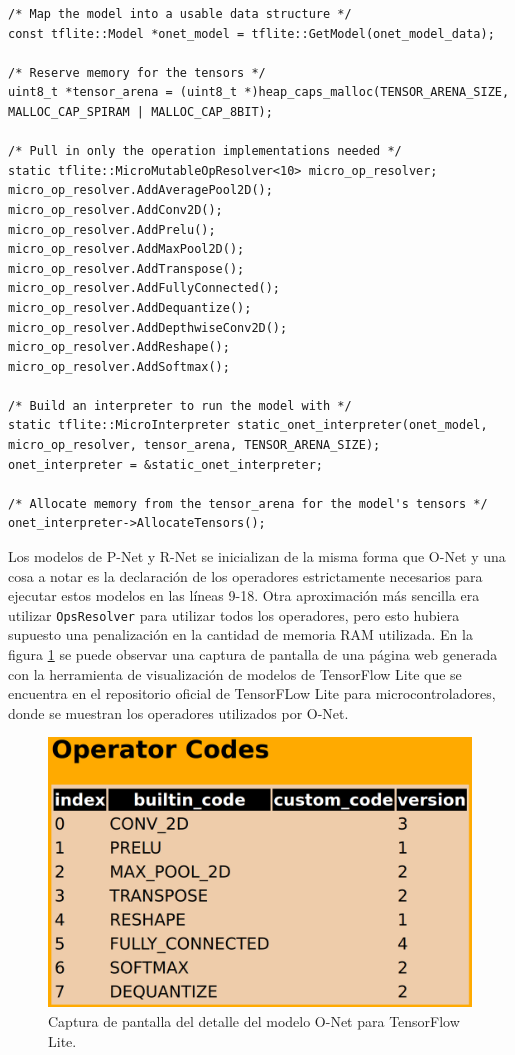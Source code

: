 \begin{lstlisting}[label=cod:tflm_init,caption=Código para inicializar O-Net con TFLite micro.]
/* Map the model into a usable data structure */
const tflite::Model *onet_model = tflite::GetModel(onet_model_data);

/* Reserve memory for the tensors */
uint8_t *tensor_arena = (uint8_t *)heap_caps_malloc(TENSOR_ARENA_SIZE, MALLOC_CAP_SPIRAM | MALLOC_CAP_8BIT);

/* Pull in only the operation implementations needed */
static tflite::MicroMutableOpResolver<10> micro_op_resolver;
micro_op_resolver.AddAveragePool2D();
micro_op_resolver.AddConv2D();
micro_op_resolver.AddPrelu();
micro_op_resolver.AddMaxPool2D();
micro_op_resolver.AddTranspose();
micro_op_resolver.AddFullyConnected();
micro_op_resolver.AddDequantize();
micro_op_resolver.AddDepthwiseConv2D();
micro_op_resolver.AddReshape();
micro_op_resolver.AddSoftmax();

/* Build an interpreter to run the model with */
static tflite::MicroInterpreter static_onet_interpreter(onet_model, micro_op_resolver, tensor_arena, TENSOR_ARENA_SIZE);
onet_interpreter = &static_onet_interpreter;

/* Allocate memory from the tensor_arena for the model's tensors */
onet_interpreter->AllocateTensors();
\end{lstlisting}

Los modelos de P-Net y R-Net se inicializan de la misma forma que O-Net y una cosa a notar es la declaración de los operadores estrictamente necesarios para ejecutar estos modelos en las líneas 9-18. Otra aproximación más sencilla era utilizar \texttt{OpsResolver} para utilizar todos los operadores, pero esto hubiera supuesto una penalización en la cantidad de memoria RAM utilizada. En la figura \ref{fig:fw_tflite_ops} se puede observar una captura de pantalla de una página web generada con la herramienta de visualización de modelos de TensorFlow Lite que se encuentra en el repositorio oficial de TensorFLow Lite para microcontroladores\cite{tflm_repo}, donde se muestran los operadores utilizados por O-Net.

\begin{figure}[h]
	\centering
	\includegraphics[scale=0.18]{./Figures/fw_tflite_ops.png}
	\caption{Captura de pantalla del detalle del modelo O-Net para TensorFlow Lite.}
	\label{fig:fw_tflite_ops}
\end{figure}

